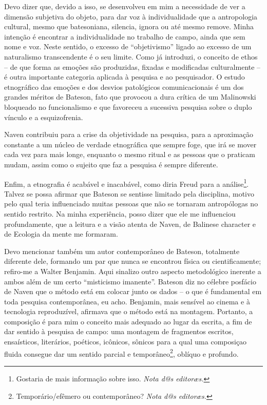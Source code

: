\documentclass[a4paper, 11pt]{article} %
\makeatletter
\newcommand{\ftnt}[1]{\footnote{#1 \emph{Nota d@s editoræs.}}}
\makeatother
\begin{document}
Devo dizer que, devido a isso, se desenvolveu em mim a necessidade de ver a dimensão subjetiva do objeto, para dar voz à individualidade que a antropologia cultural, mesmo que batesoniana, silencia, ignora ou até mesmo remove. Minha intenção é encontrar a individualidade no trabalho de campo, ainda que sem nome e voz. Neste sentido, o excesso de “objetivismo” ligado ao excesso de um naturalismo transcendente é o seu limite. Como já introduzi, o conceito de ethos – de que forma as emoções são produzidas, fixadas e modificadas culturalmente – é outra importante categoria aplicada à pesquisa e ao pesquisador. O estudo etnográfico das emoções e dos desvios patológicos comunicacionais é um dos grandes méritos de Bateson, fato que provocou a dura crítica de um Malinowski bloqueado no funcionalismo e que favoreceu a sucessiva pesquisa sobre o duplo vínculo e a esquizofrenia.

Naven contribuiu para a crise da objetividade na pesquisa, para a aproximação constante a um núcleo de verdade etnográfica que sempre foge, que irá se mover cada vez para mais longe, enquanto o mesmo ritual e as pessoas que o praticam mudam, assim como o sujeito que faz a pesquisa é sempre diferente.

Enfim, a etnografia é acabável e inacabável, como diria Freud para a análise\ftnt{Gostaria de mais informação sobre isso.}. Talvez se possa afirmar que Bateson se sentisse limitado pela disciplina, motivo pelo qual teria influenciado muitas pessoas que não se tornaram antropólogas no sentido restrito. Na minha experiência, posso dizer que ele me influenciou profundamente, que a leitura e a visão atenta de Naven, de Balinese character e de Ecologia da mente me formaram.

Devo mencionar também um autor contemporâneo de Bateson, totalmente diferente dele, formando um par que nunca se encontrou física ou cientificamente; refiro-me a Walter Benjamin. Aqui sinalizo outro aspecto metodológico inerente a ambos além de um certo “misticismo imanente”. Bateson diz no célebre posfácio de Naven que o método está em colocar junto os dados – o que é fundamental em toda pesquisa contemporânea, eu acho. Benjamin, mais sensível ao cinema e à tecnologia reproduzível, afirmava que o método está na montagem. Portanto, a composição é para mim o conceito mais adequado ao lugar da escrita, a fim de dar sentido à pesquisa de campo: uma montagem de fragmentos escritos, ensaísticos, literários, poéticos, icônicos, sônicos para a qual uma composiçao fluida consegue dar um sentido parcial e temporâneo\ftnt{Temporário/efêmero ou contemporâneo?}, oblíquo e profundo. 
\end{document}
